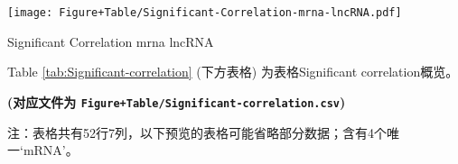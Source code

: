 \documentclass[
]{article}
\begin{document}
\def\@captype{figure}
\begin{center}
\texttt{[image: Figure+Table/Significant-Correlation-mrna-lncRNA.pdf]}
\caption{Significant Correlation mrna lncRNA}\label{fig:Significant-Correlation-mrna-lncRNA}
\end{center}

\begin{center}\vspace{1.5cm}\end{center}

\begin{center}\vspace{1.5cm}\end{center}

Table \ref{tab:Significant-correlation} (下方表格) 为表格Significant correlation概览。

\textbf{(对应文件为 \texttt{Figure+Table/Significant-correlation.csv})}

\begin{center}\begin{tcolorbox}[colback=gray!10, colframe=gray!50, width=0.9\linewidth, arc=1mm, boxrule=0.5pt]注：表格共有52行7列，以下预览的表格可能省略部分数据；含有4个唯一`mRNA'。
\end{tcolorbox}
\end{center}
\end{document}
